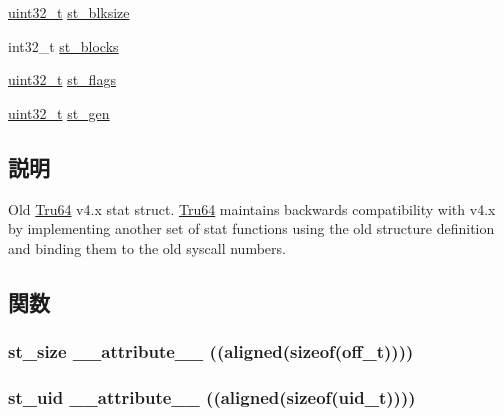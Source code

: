 \begin{DoxyCompactItemize}
\item 
\hyperlink{Type_8hh_a435d1572bf3f880d55459d9805097f62}{uint32\_\-t} \hyperlink{structTru64__PreF64_1_1pre__F64__stat_a952cc52eb5efd16f9cebffe863823593}{st\_\-blksize}
\item 
int32\_\-t \hyperlink{structTru64__PreF64_1_1pre__F64__stat_a9bdc90ebe5192856e17c3ad67c0cb140}{st\_\-blocks}
\item 
\hyperlink{Type_8hh_a435d1572bf3f880d55459d9805097f62}{uint32\_\-t} \hyperlink{structTru64__PreF64_1_1pre__F64__stat_a2bac91973217293ac3be9cd5f402a819}{st\_\-flags}
\item 
\hyperlink{Type_8hh_a435d1572bf3f880d55459d9805097f62}{uint32\_\-t} \hyperlink{structTru64__PreF64_1_1pre__F64__stat_a5c579182b97b4e228d986b8b856d44ce}{st\_\-gen}
\end{DoxyCompactItemize}


\subsection{説明}
Old \hyperlink{classTru64}{Tru64} v4.x stat struct. \hyperlink{classTru64}{Tru64} maintains backwards compatibility with v4.x by implementing another set of stat functions using the old structure definition and binding them to the old syscall numbers. 

\subsection{関数}
\hypertarget{structTru64__PreF64_1_1pre__F64__stat_a3d6ca7a7b80acd14cad7cb98240c371f}{
\subsubsection[{\_\-\_\-attribute\_\-\_\-}]{ st\_\-size \_\-\_\-attribute\_\-\_\- ((aligned(sizeof({\bf off\_\-t}))))}}
\label{structTru64__PreF64_1_1pre__F64__stat_a3d6ca7a7b80acd14cad7cb98240c371f}
\hypertarget{structTru64__PreF64_1_1pre__F64__stat_a9e6045dec3e69974586d17b8d3d8bfd6}{
\subsubsection[{\_\-\_\-attribute\_\-\_\-}]{ st\_\-uid \_\-\_\-attribute\_\-\_\- ((aligned(sizeof({\bf uid\_\-t}))))}}
\label{structTru64__PreF64_1_1pre__F64__stat_a9e6045dec3e69974586d17b8d3d8bfd6}


